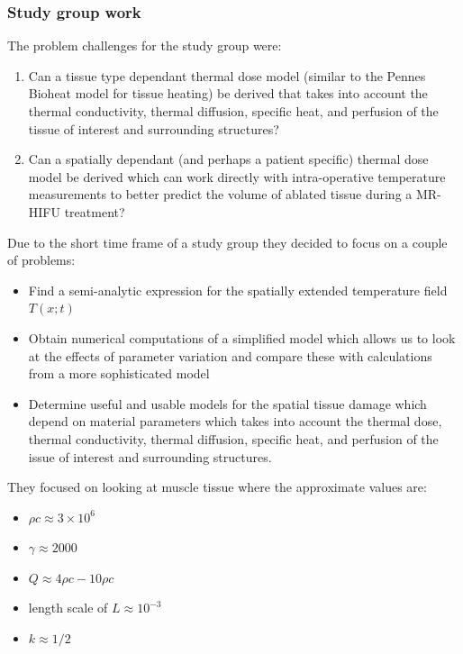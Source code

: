 \documentclass[11pt]{article} %
\begin{document}
	 	
	 	\subsubsection{Study group work}
	 	The problem challenges for the study group were: 
	 	\begin{enumerate}
	 		\item Can a tissue type dependant thermal dose model (similar to the Pennes Bioheat model for tissue heating) be derived that takes into account the thermal conductivity, thermal diffusion, specific heat, and perfusion of the tissue of interest and surrounding structures?
	 	\item 	Can a spatially dependant (and perhaps a patient specific) thermal dose model be derived which can work directly with intra-operative temperature measurements to better predict the volume of ablated tissue during a MR-HIFU treatment?
	 	\end{enumerate}
	 	
	 	Due to the short time frame of a study group they decided to focus on a couple of problems: 
	 	
	 	\begin{itemize}
	 		\item Find a semi-analytic expression for the spatially extended
	 	temperature field $ T(x; t) $
	 	\item Obtain numerical computations of a simplified model which
	 	allows us to look at the effects of parameter variation and
	 	compare these with calculations from a more sophisticated
	 	model
	 	\item Determine useful and usable models for the spatial tissue
	 	damage which depend on material parameters which takes
	 	into account the thermal dose, thermal conductivity, thermal
	 	diffusion, specific heat, and perfusion of the issue of interest
	 	and surrounding structures.
	 	\end{itemize}
	 	They focused on looking at muscle tissue where the approximate values are:
	 	\begin{itemize}
	 		\item $\rho c \approx 3 \times 10^6$
	 		\item $\gamma \approx 2000$
	 		\item $Q \approx 4\rho c-10 \rho c$
	 		\item length scale of $L \approx 10^{-3}$
	 		\item $k \approx 1/2$
	 	\end{itemize}
 	
\end{document}
